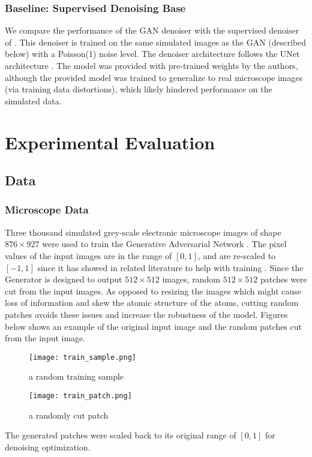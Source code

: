 \documentclass{article}
\begin{document}
\subsubsection{Baseline: Supervised Denoising Base}
We compare the performance of the GAN denoiser with the supervised denoiser of \cite{mohan_microscope}. This denoiser is trained on the same simulated images as the GAN (described below) with a Poisson(1) noise level. The denoiser architecture follows the UNet architecture \cite{unet}. The model was provided with pre-trained weights by the authors, although the provided model was trained to generalize to real microscope images (via training data distortions), which likely hindered performance on the simulated data. 

\section{Experimental Evaluation}
\subsection{Data} 
\subsubsection{Microscope Data}
Three thousand simulated grey-scale electronic microscope images of shape $876\times 927$ were used to train the Generative Adversarial Network \cite{mohan_microscope}. The pixel values of the input images are in the range of $[0, 1]$, and are re-scaled to $[-1, 1]$ since it has showed in related literature to help with training \cite{DCGAN}. Since the Generator is designed to output $512\times 512$ images, random $512\times 512$ patches were cut from the input images. As opposed to resizing the images which might cause loss of information and skew the atomic structure of the atoms, cutting random patches avoids these issues and increase the robustness of the model. Figures below shows an example of the original input image and the random patches cut from the input image.
\begin{figure}[h!]
\centering
\begin{minipage}{.5\textwidth}
  \centering
  \texttt{[image: train\_sample.png]}
  \caption{a random training sample}
  \label{fig:sample}
\end{minipage}%
\begin{minipage}{.5\textwidth}
  \centering
  \texttt{[image: train\_patch.png]}
  \caption{a randomly cut patch}
  \label{fig:patch}
\end{minipage}
\end{figure}
\FloatBarrier
The generated patches were scaled back to its original range of $[0, 1]$ for denoising optimization.
\end{document}
